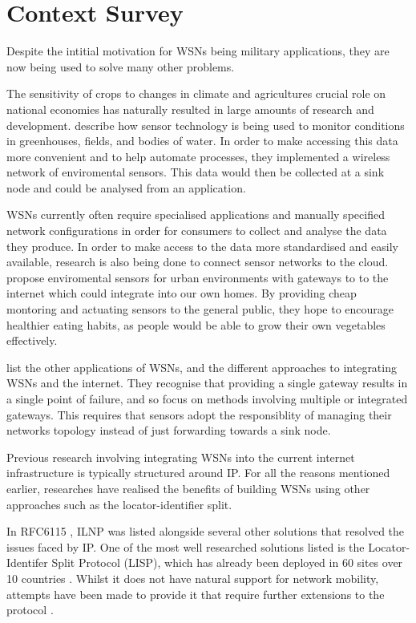 \documentclass[12pt]{article}
\begin{document}
\section{Context Survey}

Despite the intitial motivation for WSNs being military applications, they are now being used to solve many other problems.

The sensitivity of crops to changes in climate and agricultures crucial role on national economies has naturally resulted in large amounts of research and development. \cite{agrisensor} describe how sensor technology is being used to monitor conditions in greenhouses, fields, and bodies of water. In order to make accessing this data more convenient and to help automate processes, they implemented a wireless network of enviromental sensors. This data would then be collected at a sink node and could be analysed from an application. 

WSNs currently often require specialised applications and manually specified network configurations in order for consumers to collect and analyse the data they produce. In order to make access to the data more standardised and easily available, research is also being done to connect sensor networks to the cloud. \cite{indoor} propose enviromental sensors for urban environments with gateways to to the internet which could integrate into our own homes. By providing cheap montoring and actuating sensors to the general public, they hope to encourage healthier eating habits, as people would be able to grow their own vegetables effectively. 

\cite{wsnlist} list the other applications of WSNs, and the different approaches to integrating WSNs and the internet. They recognise that providing a single gateway results in a single point of failure, and so focus on methods involving multiple or integrated gateways. This requires that sensors adopt the responsiblity of managing their networks topology instead of just forwarding towards a sink node. 

Previous research involving integrating WSNs into the current internet infrastructure is typically structured around IP. For all the reasons mentioned earlier, researches have realised the benefits of building WSNs using other approaches such as the locator-identifier split.

In RFC6115 \cite{rfc6115}, ILNP was listed alongside several other solutions that resolved the issues faced by IP. One of the most well researched solutions listed is the Locator-Identifer Split Protocol (LISP), which has already been deployed in 60 sites over 10 countries \cite{nahla}. Whilst it does not have natural support for network mobility, attempts have been made to provide it that require further extensions to the protocol \cite{moblisp}. 
\end{document}
